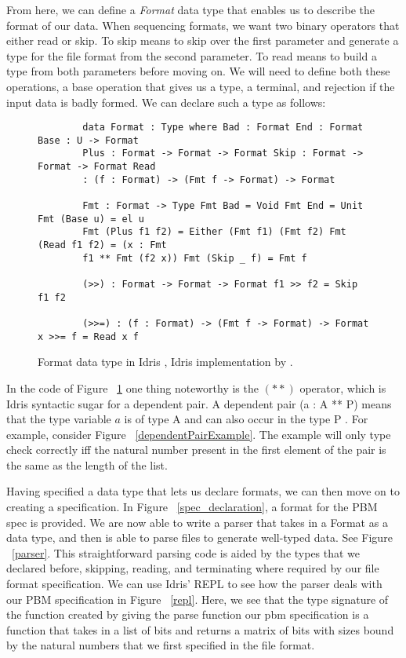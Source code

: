 From here, we can define a \textit{Format} data type that enables us to describe
the format of our data. When sequencing formats, we want two binary operators
that either read or skip. To skip means to skip over the first parameter and
generate a type for the file format from the second parameter. To read means to
build a type from both parameters before moving on. We will need to define both
these operations, a base operation that gives us a type, a terminal, and
rejection if the input data is badly formed. We can declare such a type as
follows: 

\begin{figure}
    \caption{Format data type in Idris \cite{power_of_pi}, Idris implementation
    by \cite{idris_pop}.}
    \label{formatDeclaration}
    \begin{lstlisting}
        data Format : Type where Bad : Format End : Format Base : U -> Format
        Plus : Format -> Format -> Format Skip : Format -> Format -> Format Read
        : (f : Format) -> (Fmt f -> Format) -> Format

        Fmt : Format -> Type Fmt Bad = Void Fmt End = Unit Fmt (Base u) = el u
        Fmt (Plus f1 f2) = Either (Fmt f1) (Fmt f2) Fmt (Read f1 f2) = (x : Fmt
        f1 ** Fmt (f2 x)) Fmt (Skip _ f) = Fmt f

        (>>) : Format -> Format -> Format f1 >> f2 = Skip f1 f2

        (>>=) : (f : Format) -> (Fmt f -> Format) -> Format x >>= f = Read x f
    \end{lstlisting}
\end{figure}

In the code of Figure ~\ref{formatDeclaration} one thing noteworthy is the
$(**)$ operator, which is Idris syntactic sugar for a dependent pair. A
dependent pair (a : A ** P) means that the type variable $a$ is of type A and
can also occur in the type P \cite{idris_dependent_pairs}. For example, consider
Figure ~\ref{dependentPairExample}. The example will only type check correctly
iff the natural number present in the first element of the pair is the same as
the length of the list. 

Having specified a data type that lets us declare formats, we can then move on
to creating a specification. In Figure ~\ref{spec_declaration}, a format for the
PBM spec is provided. We are now able to write a parser that takes in a Format
as a data type, and then is able to parse files to generate well-typed data. See
Figure ~\ref{parser}. This straightforward parsing code is aided by the types
that we declared before, skipping, reading, and terminating where required by
our file format specification. We can use Idris' REPL to see how the parser
deals with our PBM specification in Figure ~\ref{repl}. Here, we see that the
type signature of the function created by giving the parse function our pbm
specification is a function that takes in a list of bits and returns a matrix of
bits with sizes bound by the natural numbers that we first specified in the file
format. 

